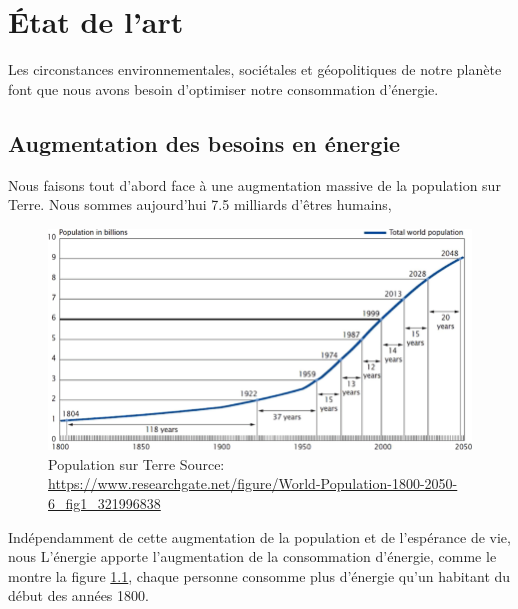 \chapter{État de l’art}

Les circonstances environnementales, sociétales et géopolitiques de notre planète 
font que nous avons besoin d'optimiser notre consommation d'énergie. 


\section{Augmentation des besoins en énergie}

Nous faisons tout d'abord face à une augmentation massive de la population sur Terre. 
Nous sommes aujourd'hui 7.5 milliards d'êtres humains, 
\begin{figure}
  \centering
  \includegraphics[scale=0.35]{media/WorldPopulation.png}
  \caption{
      Population sur Terre\newline
      \tiny{Source:\newline
        \url{https://www.researchgate.net/figure/World-Population-1800-2050-6_fig1_321996838}
      }
  }
  \label{fig:capita_energy}
\end{figure}


Indépendamment de cette augmentation de la population et de l'espérance de vie, nous 
L'énergie apporte l'augmentation de la consommation d'énergie, comme le montre la figure
\ref{fig:capita_energy}, chaque personne consomme plus d'énergie qu'un habitant
du début des années 1800.

